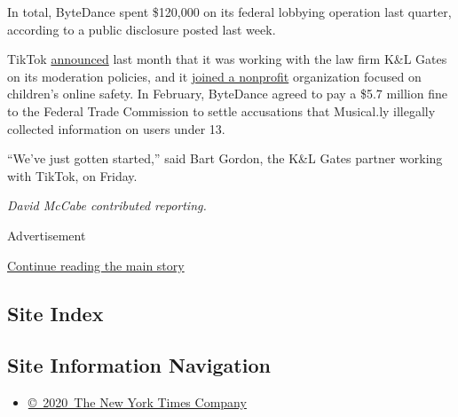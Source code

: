 In total, ByteDance spent \$120,000 on its federal lobbying operation
last quarter, according to a public disclosure posted last week.

TikTok
\href{https://newsroom.tiktok.com/en-us/our-commitment-to-our-users-and-the-tik-tok-experience}{announced}
last month that it was working with the law firm K\&L Gates on its
moderation policies, and it
\href{https://www.fosi.org/about/press/fosi-welcomes-tiktok/}{joined a
nonprofit} organization focused on children's online safety. In
February, ByteDance agreed to pay a \$5.7 million fine to the Federal
Trade Commission to settle accusations that Musical.ly illegally
collected information on users under 13.

``We've just gotten started,'' said Bart Gordon, the K\&L Gates partner
working with TikTok, on Friday.

\emph{David McCabe contributed reporting.}

Advertisement

\protect\hyperlink{after-bottom}{Continue reading the main story}

\hypertarget{site-index}{%
\subsection{Site Index}\label{site-index}}

\hypertarget{site-information-navigation}{%
\subsection{Site Information
Navigation}\label{site-information-navigation}}

\begin{itemize}
\tightlist
\item
  \href{https://help.nytimes.com/hc/en-us/articles/115014792127-Copyright-notice}{©~2020~The
  New York Times Company}
\end{itemize}

